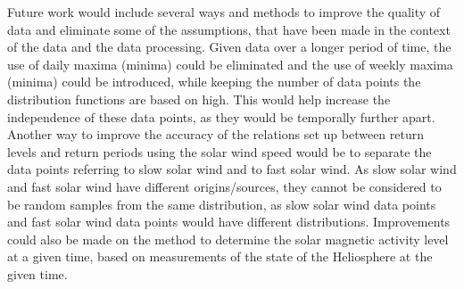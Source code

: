 \documentclass[12pt]{article}
\begin{document}
    Future work would include several ways and methods to improve the quality of data and eliminate some of the assumptions, that have been made in the context of the data and the data processing. Given data over a longer period of time, the use of daily maxima (minima) could be eliminated and the use of weekly maxima (minima) could be introduced, while keeping the number of data points the distribution functions are based on high. This would help increase the independence of these data points, as they would be temporally further apart. Another way to improve the accuracy of the relations set up between return levels and return periods using the solar wind speed would be to separate the data points referring to slow solar wind and to fast solar wind. As slow solar wind and fast solar wind have different origins/sources, they cannot be considered to be random samples from the same distribution, as slow solar wind data points and fast solar wind data points would have different distributions. Improvements could also be made on the method to determine the solar magnetic activity level at a given time, based on measurements of the state of the Heliosphere at the given time.
\newpage{}



\end{document}
